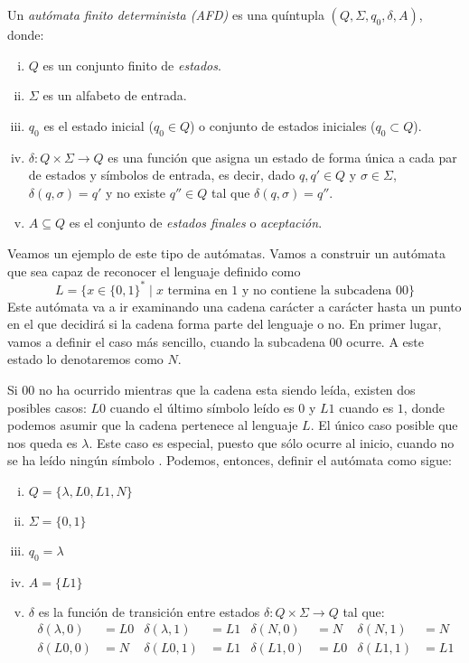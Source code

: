 \begin{definicion}Un \textit{autómata finito determinista (AFD)} es una quíntupla 
$(Q,\Sigma,q_0,\delta,A)$, donde:
\begin{enumerate}[(i)]
    \item $Q$ es un conjunto finito de \textit{estados}.
    \item $\Sigma$ es un alfabeto de entrada.
    \item $q_0$ es el estado inicial ($q_0\in Q$) o conjunto de estados iniciales ($q_0\subset Q$).
    \item $\delta:Q\times\Sigma\to Q$ es una función que asigna un estado de forma única a cada par de estados y 
    símbolos de entrada, es decir, dado $q,q'\in Q$ y $\sigma\in\Sigma$, $\delta(q,\sigma)=q'$ y no existe 
    $q''\in Q$ tal que $\delta(q,\sigma)=q''$.
    \item $A\subseteq Q$ es el conjunto de \textit{estados finales} o \textit{aceptación}.    
\end{enumerate}
\end{definicion}

Veamos un ejemplo de este tipo de autómatas. Vamos a construir un autómata que sea capaz de reconocer el lenguaje
definido como
\begin{equation}
    L=\{x\in\{0,1\}^*\mid x\text{ termina en }1\text{ y no contiene la subcadena }00\}
\end{equation}
Este autómata va a ir examinando una cadena carácter a carácter hasta un punto en el que decidirá si la cadena forma
parte del lenguaje o no. En primer lugar, vamos a definir el caso más sencillo, cuando la subcadena $00$ ocurre.
A este estado lo denotaremos como $N$.

\vspace{10pt}
Si $00$ no ha ocurrido mientras que la cadena esta siendo leída, existen dos posibles casos: $L0$ cuando el último
símbolo leído es $0$ y $L1$ cuando es $1$, donde podemos asumir que la cadena pertenece al lenguaje $L$. El único
caso posible que nos queda es $\lambda$. Este caso es especial, puesto que sólo ocurre al inicio, cuando no se ha leído
ningún símbolo \cite{chakraborty_2003}. Podemos, entonces, definir el autómata como sigue:
\begin{enumerate}[(i)]
    \item $Q=\{\lambda,L0,L1,N\}$
    \item $\Sigma=\{0,1\}$
    \item $q_0=\lambda$
    \item $A=\{L1\}$
    \item $\delta$ es la función de transición entre estados 
    $\delta:Q\times\Sigma\to Q$ tal que:
    \begin{align*}
        \delta(\lambda,0)&=L0 & \delta(\lambda,1)&=L1 & \delta(N,0)&=N & \delta(N,1)&=N \\
        \delta(L0,0)&=N & \delta(L0,1)&=L1 & \delta(L1,0)&=L0 & \delta(L1,1)&=L1
    \end{align*}
\end{enumerate}

